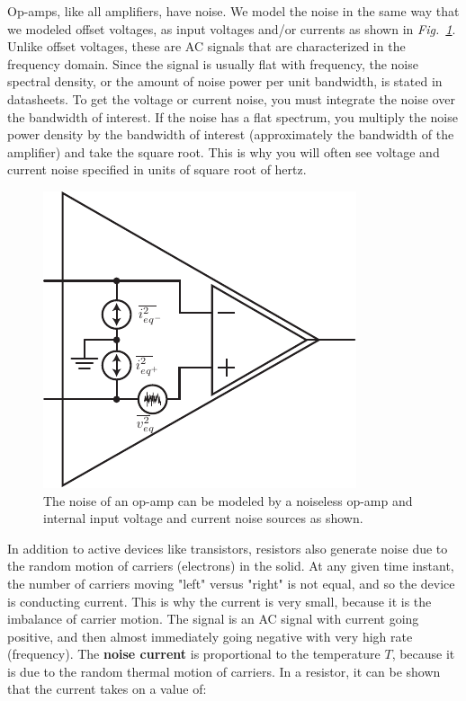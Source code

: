 Op-amps, like all amplifiers, have noise.  We model the noise in the same way that we modeled offset voltages, as input voltages and/or currents as shown in \emph{Fig.~\ref{fig:opamp_noise}}.  Unlike offset voltages, these are AC signals that are characterized in the frequency domain.  Since the signal is usually flat with frequency, the noise spectral density, or the amount of noise power per unit bandwidth, is stated in datasheets.  To get the voltage or current noise, you must integrate the noise over the bandwidth of interest.  If the noise has a flat spectrum, you multiply the noise power density by the bandwidth of interest (approximately the bandwidth of the amplifier) and take the square root.  This is why you will often see voltage and current noise specified in units of square root of hertz.
\begin{figure}[H]
\centering
\includegraphics[scale=1.15]{opamp_noise}
\caption{The noise of an op-amp can be modeled by a noiseless op-amp and internal input voltage and current noise sources as shown.}
\label{fig:opamp_noise}
\end{figure}
\newpage
In addition to active devices like transistors, resistors also generate noise due to the random motion of carriers (electrons) in the solid.  At any given time instant, the number of carriers moving "left" versus "right" is not equal, and so the device is conducting current. This is why the current is very small, because it is the imbalance of carrier motion. The signal is an AC signal with current going positive, and then almost immediately going negative with very high rate (frequency).  The \textbf{noise current} is proportional to the temperature $T$, because it is due to the random thermal motion of carriers.  In a resistor, it can be shown that the current takes on a value of:

